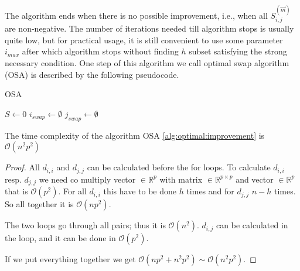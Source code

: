The algorithm ends when there is no possible improvement, i.e., when all $S^{(\vec{m})}_{i,j}$ are non-negative.
The number of iterations needed till algorithm stops is usually quite low, but for practical usage, it is still convenient to use some parameter $i_{max}$ after which algorithm stops without finding $h$ subset satisfying the strong necessary condition. 
One step of this algorithm we call optimal swap algorithm (OSA) is described by the following pseudocode.

\begin{algorithm}[H]
    \label{alg:optimal:improvement}
    \caption{OSA}
    
    $S \gets 0$\;
    $i_{swap} \gets \emptyset$\;
    $j_{swap} \gets \emptyset$\;

    \;
\end{algorithm}



\begin{observation} 
     The time complexity of the algorithm OSA \ref{alg:optimal:improvement} is $\mathcal{O}(n^2p^2)$
\end{observation} 


\begin{proof}
All $d_{i,i}$ and $d_{j,j}$ can be calculated before the for loops. 
To calculate $d_{i,i}$ resp. $d_{j,j}$ we need co multiply vector $\in \mathbb{R}^p$ with matrix  $\in \mathbb{R}^{p \times p}$ and vector $\in \mathbb{R}^p$ that is $\mathcal{O}(p^2)$. For all $d_{i,i}$ this have to be done $h$ times and for $d_{j,j}$ $n-h$ times. So all together it is $\mathcal{O}(np^2)$. 

The two loops go through all pairs; thus it is $\mathcal{O}(n^2)$. $d_{i,j}$ can be calculated in the loop, and it can be done in $\mathcal{O}(p^2)$.

If we put everything together we get 
$\mathcal{O}(np^2 + n^2p^2) \sim \mathcal{O}(n^2p^2)$.
\end{proof}


